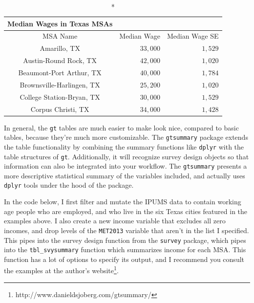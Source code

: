 \documentclass[
  letterpaper,
  DIV=11,
  numbers=noendperiod]{scrreprt}
\begin{document}
\begin{longtable*}{crr}
\caption*{
{\large Median Wages in Texas MSAs}
} \\ 
\toprule
MSA Name & Median Wage & Median Wage SE \\ 
\midrule
Amarillo, TX & $33,000$ & $1,529$ \\ 
Austin-Round Rock, TX & $42,000$ & $1,020$ \\ 
Beaumont-Port Arthur, TX & $40,000$ & $1,784$ \\ 
Brownsville-Harlingen, TX & $25,200$ & $1,020$ \\ 
College Station-Bryan, TX & $30,000$ & $1,529$ \\ 
Corpus Christi, TX & $34,000$ & $1,428$ \\ 
\bottomrule
\end{longtable*}

In general, the \texttt{gt} tables are much easier to make look nice,
compared to basic tables, because they're much more customizable. The
\texttt{gtsummary} package extends the table functionality by combining
the summary functions like \texttt{dplyr} with the table structures of
\texttt{gt}. Additionally, it will recognize survey design objects so
that information can also be integrated into your workflow. The
\texttt{gtsummary} presents a more descriptive statistical summary of
the variables included, and actually uses \texttt{dplyr} tools under the
hood of the package.

In the code below, I first filter and mutate the IPUMS data to contain
working age people who are employed, and who live in the six Texas
cities featured in the examples above. I also create a new income
variable that excludes all zero incomes, and drop levels of the
\texttt{MET2013} variable that aren't in the list I specified. This
pipes into the survey design function from the \texttt{survey} package,
which pipes into the \texttt{tbl\_svysummary} function which summarizes
income for each MSA. This function has a lot of options to specify its
output, and I recommend you consult the examples at the author's
website\footnote{http://www.danieldsjoberg.com/gtsummary/}.
\end{document}

